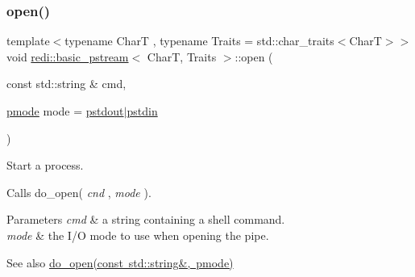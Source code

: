 \subsubsection{\texorpdfstring{open()}{open()}\hspace{0.1cm}{\footnotesize\ttfamily [1/2]}}
{\footnotesize\ttfamily template$<$typename CharT , typename Traits  = std\+::char\+\_\+traits$<$\+Char\+T$>$$>$ \\
void \mbox{\hyperlink{classredi_1_1basic__pstream}{redi\+::basic\+\_\+pstream}}$<$ CharT, Traits $>$\+::open (\begin{DoxyParamCaption}\item[{const std\+::string \&}]{cmd,  }\item[{\mbox{\hyperlink{structredi_1_1pstreams_a1eae4aad88812af03a0fbb3ec13c50b7}{pmode}}}]{mode = {\ttfamily \mbox{\hyperlink{structredi_1_1pstreams_ad3c6d53a98de4566478b1c40c101a42b}{pstdout}}$\vert$\mbox{\hyperlink{structredi_1_1pstreams_a7a976ce992db857f86a0cc3352e42d3a}{pstdin}}} }\end{DoxyParamCaption})\hspace{0.3cm}{\ttfamily [inline]}}



Start a process. 

Calls do\+\_\+open( {\itshape cnd} , {\itshape mode} ).


\begin{DoxyParams}{Parameters}
{\em cmd} & a string containing a shell command. \\
\hline
{\em mode} & the I/O mode to use when opening the pipe. \\
\hline
\end{DoxyParams}
\begin{DoxySeeAlso}{See also}
\mbox{\hyperlink{classredi_1_1pstream__common_a2505ab3e3a834b92d98b5bcb97734dfe}{do\+\_\+open(const std\+::string\&, pmode)}} 
\end{DoxySeeAlso}
\mbox{\label{classredi_1_1basic__pstream_a4f2e9ab168a74b8ea9a8546870085e4b}} 
